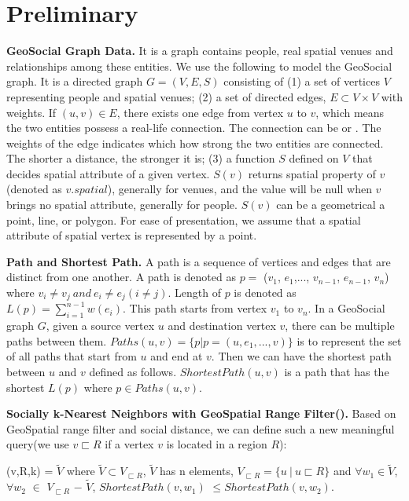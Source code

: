 \section{Preliminary}
\label{sec:preliminary}


{\bf GeoSocial Graph Data.} It is a graph contains people, real spatial venues and relationships among these entities. We use the following to model the GeoSocial graph. It is a directed graph $G=(V,E,S)$ consisting of (1) a set of vertices $V$ representing people and spatial venues; (2) a set of directed edges, $E\subset V\times V$ with weights. If $(u,v)\in E$, there exists one edge from vertex $u$ to $v$, which means the two entities possess a real-life connection. The connection can be {\Friendof} or {\Rate}. The weights of the edge indicates which how strong the two entities are connected. The shorter a distance, the stronger it is; (3) a function $S$ defined on $V$ that decides spatial attribute of a given vertex. $S(v)$ returns spatial property of $v$ (denoted as $v.spatial$), generally for venues, and the value will be null when $v$ brings no spatial attribute, generally for people. $S(v)$ can be a geometrical a point, line, or polygon. For ease of presentation, we assume that a spatial attribute of spatial vertex is represented by a point.

\textbf{Path and Shortest Path.} A path is a sequence of vertices and edges that are distinct from one another. A path is denoted as $p =$ ($v_1$, $e_1$,..., $v_{n-1}$, $e_{n-1}$, $v_n$) where $v_i\neq v_j~and~e_i\neq e_j (i\neq j)$. Length of $p$ is denoted as $L(p) = \sum\limits_{i = 1}^{n-1}w(e_i)$. This path starts from vertex $v_1$ to $v_n$. In a GeoSocial graph $G$, given a source vertex $u$ and destination vertex $v$, there can be multiple paths between them. $Paths(u,v) = \{p|p = (u,e_1,..., v)\}$ is to represent the set of all paths that start from $u$ and end at $v$. Then we can have the shortest path between $u$ and $v$ defined as follows. $ShortestPath(u,v)$ is a path that has the shortest $L(p)$ where $p\in Paths(u,v)$.

\textbf{Socially k-Nearest Neighbors with GeoSpatial Range Filter({\query}).} Based on GeoSpatial range filter and social distance, we can define such a new meaningful query(we use $v\sqsubset R$ if a vertex $v$ is located in a region $R$):
\begin{defn}
	{\query}(v,R,k) = $\widetilde{V}$ where $\widetilde{V}\subset V_{\sqsubset R}$, $\widetilde{V}$ has n elements, $V_{\sqsubset R} = \{u~|~u\sqsubset R\}$ and $\forall w_1\in \widetilde{V}$, $\forall w_2$ $\in$ $V_{\sqsubset R}$ $-$ $\widetilde{V}$, $ShortestPath(v,w_1)$ $\leqslant ShortestPath(v,w_2)$.
\end{defn}

